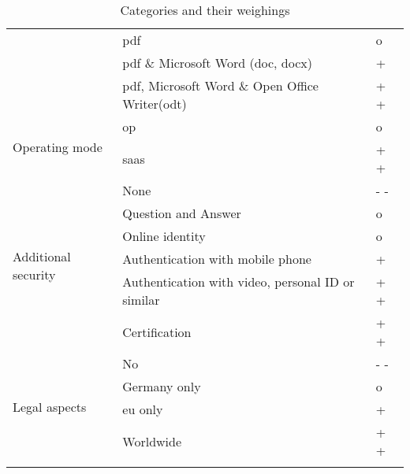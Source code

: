 \begin{longtable}{|p{4cm}|p{9cm}|p{1.5cm}|}
												& \Gls{pdf} & o \\ \cline{2-3}
												& \Gls{pdf} \& Microsoft Word (doc, docx) & + \\ \cline{2-3}
												& \Gls{pdf}, Microsoft Word \& Open Office Writer(odt) & + + \\ \hline
		\multirow{2}{*}{Operating mode} & \gls{op} & o \\ \cline{2-3}
										 & \gls{saas} & + + \\ \hline
		\multirow{6}{*}{Additional security} & None & - - \\ \cline{2-3}
											& Question and Answer & o \\ \cline{2-3} 
											& Online identity & o \\ \cline{2-3}
											& Authentication with mobile phone & + \\ \cline{2-3}
											& Authentication with video, personal ID or similar & + + \\ \cline{2-3}
											& Certification & + + \\ \hline
		\multirow{4}{*}{Legal aspects} & No & - - \\ \cline{2-3}
										& Germany only & o \\ \cline{2-3}
										& \Gls{eu} only & + \\ \cline{2-3}
										& Worldwide & + + \\ \hline
	\caption{Categories and their weighings}
	\label{tab:resTcateg}
	\end{longtable}
